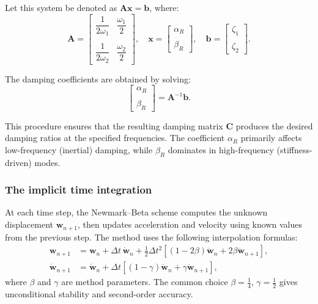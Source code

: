 \documentclass{article}
\begin{document}
	Let this system be denoted as \( \mathbf{A} \boldsymbol{x} = \boldsymbol{b} \), where:
	\[
	\mathbf{A} =
	\begin{bmatrix}
		\dfrac{1}{2\omega_1} & \dfrac{\omega_1}{2} \\\\
		\dfrac{1}{2\omega_2} & \dfrac{\omega_2}{2}
	\end{bmatrix},
	\quad
	\boldsymbol{x} =
	\begin{bmatrix}
		\alpha_R \\\\
		\beta_R
	\end{bmatrix},
	\quad
	\boldsymbol{b} =
	\begin{bmatrix}
		\zeta_1 \\\\
		\zeta_2
	\end{bmatrix}.
	\]
	
	The damping coefficients are obtained by solving:
	\begin{equation}
		\begin{bmatrix}
			\alpha_R \\\\
			\beta_R
		\end{bmatrix}
		=
		\mathbf{A}^{-1} \boldsymbol{b}.
	\end{equation}
	
	This procedure ensures that the resulting damping matrix \( \mathbf{C} \) produces the desired damping ratios at the specified frequencies. The coefficient \( \alpha_R \) primarily affects low-frequency (inertial) damping, while \( \beta_R \) dominates in high-frequency (stiffness-driven) modes.
	
	
\subsubsection{The implicit time integration}
	At each time step, the Newmark--Beta scheme computes the unknown displacement \( \mathit{\mathbf{w}}_{n+1} \), then updates acceleration and velocity using known values from the previous step. The method uses the following interpolation formulas:
	\begin{align}
		\mathit{\mathbf{w}}_{n+1} &= \mathit{\mathbf{w}}_n + \Delta t\, \dot{\mathit{\mathbf{w}}}_n + \frac{1}{2} \Delta t^2 \left[ (1 - 2\beta) \ddot{\mathit{\mathbf{w}}}_n + 2\beta \ddot{\mathit{\mathbf{w}}}_{n+1} \right], \\
		\dot{\mathit{\mathbf{w}}}_{n+1} &= \dot{\mathit{\mathbf{w}}}_n + \Delta t \left[ (1 - \gamma) \ddot{\mathit{\mathbf{w}}}_n + \gamma \ddot{\mathit{\mathbf{w}}}_{n+1} \right],
	\end{align}
	where \( \beta \) and \( \gamma \) are method parameters. The common choice \( \beta = \tfrac{1}{4} \), \( \gamma = \tfrac{1}{2} \) gives unconditional stability and second-order accuracy.
	
\end{document}
